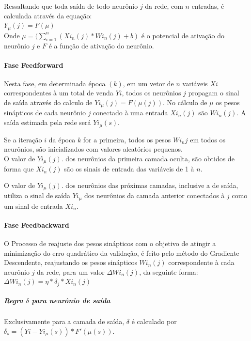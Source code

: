     Ressaltando que toda saída de todo neurônio $j$ da rede, com $n$ entradas, é calculada através da equação:\\
    $ Y_{\mu}(j) = F(\mu)$\\
    Onde $\mu = (\sum_{i=1}^{n} (Xi_{n}(j)*Wi_{n}(j) + b)$ é o potencial de ativação do neurônio $j$ e $F$ é a função de ativação do neurônio.
    
    \paragraph*{Fase Feedforward}
    Nesta fase, em determinada época $(k)$, em um vetor de $n$ variáveis $Xi$ correspondentes à um total de venda $Yi$, todos os neurônios $j$ propagam o sinal de saída através do calculo de $Yi_{\mu}(j) = F(\mu(j))$. No cálculo de $\mu$ os pesos sinápticos de cada neurônio $j$ conectado à uma entrada $Xi_{n}(j)$ são $Wi_{n}(j)$. A saída estimada pela rede será $Yi_{\mu}(s)$.
    
    Se a iteração $i$ da época $k$ for a primeira, todos os pesos $Wi_{n}j$ em todos os neurônios, são inicializados com valores aleatórios pequenos.\\ 
    
    O valor de $Yi_{\mu}(j)$. dos neurônios da primeira camada oculta, são obtidos de forma que $Xi_{n}(j)$ são os sinais de entrada das variáveis de 1 à $n$.
    
    O valor de $Yi_{\mu}(j)$. dos neurônios das próximas camadas, inclusive a de saída, utiliza o sinal de saída $Yi_{\mu}$ dos neurônios da camada anterior conectados à $j$ como um sinal de entrada $Xi_{n}$.
    
    \paragraph*{Fase Feedbackward}
    O Processo de reajuste dos pesos sinápticos com o objetivo de atingir a minimização do erro quadrático da validação, é feito pelo método do Gradiente Descendente, reajustando os pesos sinápticos $Wi_{n}(j)$ correspondente à cada neurônio $j$ da rede, para um valor $\Delta Wi_{n}(j)$, da seguinte forma:\\
    $\Delta Wi_{n}(j) = \eta*\delta_j*Xi_{n}(j)$\\
    
    \subparagraph*{Regra $\delta$ para neurônio de saída}
    Exclusivamente para a camada de saída, $\delta$ é calculado por\\
    $\delta_s = (Yi - Yi_{\mu}(s) )*F'(\mu(s))$.
    
